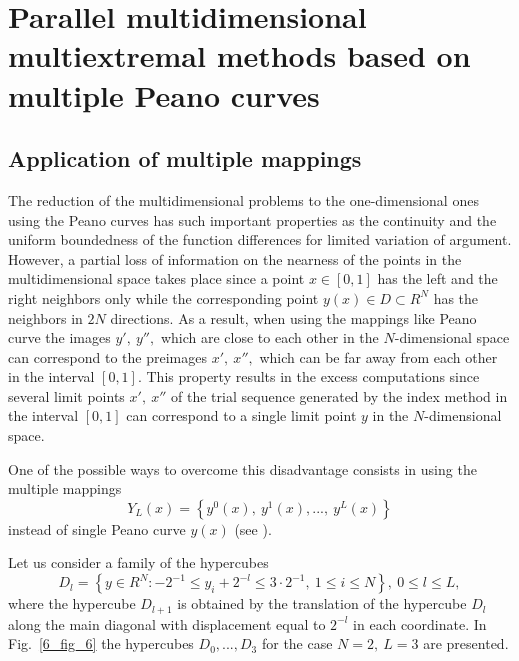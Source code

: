 \section{Parallel multidimensional multiextremal methods based on multiple Peano curves}

\subsection{Application of multiple mappings}\label{6_section_shift}

The reduction of the multidimensional problems to the one-dimensional ones using the Peano curves has such important properties as the continuity and the uniform boundedness of the function differences for limited variation of argument. However, a partial loss of information on the nearness of the points in the multidimensional space takes place since a point $x \in [0,1]$ has the left and the right neighbors only while the corresponding point $y(x) \in D \subset R^N$ has the neighbors in $2N$ directions. As a result, when using the mappings like Peano curve the images $y',\ y'',$ which are close to each other in the $N$-dimensional space can correspond to the preimages $x',\ x'',$ which can be far away from each other in the interval $[0,1]$. This property results in the excess computations since several limit points $x',\ x''$ of the trial sequence generated by the index method in the interval $[0,1]$ can correspond to a single limit point $y$ in the $N$-dimensional space.

One of the possible ways to overcome this disadvantage consists in using the multiple mappings
\begin{equation}%
Y_L(x)=\left\{y^0(x),\ y^1(x),...,\ y^L(x)\right\}
\end{equation}
instead of single Peano curve $y(x)$ (see \cite{6_Strongin1991,6_Strongin1992,6_Strongin2000}).

Let us consider a family of the hypercubes 
\begin{equation}\label{6_hypercubes}
D_l= \left\{y \in R^N: -2^{-1} \leq y_i+2^{-l} \leq 3 \cdot 2^{-1},\ 1\leq i\leq N\right\},\ 0 \leq l \leq L,
\end{equation}
where the hypercube $D_{l+1}$ is obtained by the translation of the hypercube $D_l$ along the main diagonal with displacement equal to $2^{-l}$ in each coordinate. In Fig.~\ref{6_fig_6} the hypercubes $D_0,...,D_3$ for the case $N=2,\ L=3$ are presented.

